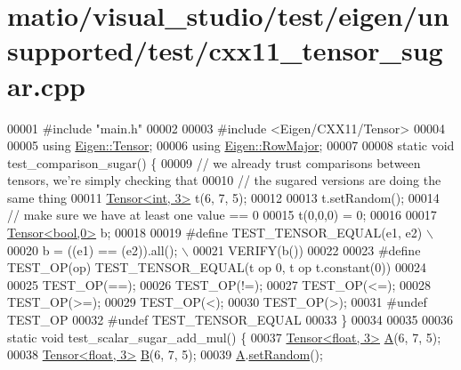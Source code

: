 \hypertarget{matio_2visual__studio_2test_2eigen_2unsupported_2test_2cxx11__tensor__sugar_8cpp_source}{}\section{matio/visual\+\_\+studio/test/eigen/unsupported/test/cxx11\+\_\+tensor\+\_\+sugar.cpp}
\label{matio_2visual__studio_2test_2eigen_2unsupported_2test_2cxx11__tensor__sugar_8cpp_source}

\begin{DoxyCode}
00001 \textcolor{preprocessor}{#include "main.h"}
00002 
00003 \textcolor{preprocessor}{#include <Eigen/CXX11/Tensor>}
00004 
00005 \textcolor{keyword}{using} \hyperlink{class_eigen_1_1_tensor}{Eigen::Tensor};
00006 \textcolor{keyword}{using} \hyperlink{group__enums_ggaacded1a18ae58b0f554751f6cdf9eb13acfcde9cd8677c5f7caf6bd603666aae3}{Eigen::RowMajor};
00007 
00008 \textcolor{keyword}{static} \textcolor{keywordtype}{void} test\_comparison\_sugar() \{
00009   \textcolor{comment}{// we already trust comparisons between tensors, we're simply checking that}
00010   \textcolor{comment}{// the sugared versions are doing the same thing}
00011   \hyperlink{class_eigen_1_1_tensor}{Tensor<int, 3>} t(6, 7, 5);
00012 
00013   t.setRandom();
00014   \textcolor{comment}{// make sure we have at least one value == 0}
00015   t(0,0,0) = 0;
00016 
00017   \hyperlink{class_eigen_1_1_tensor}{Tensor<bool,0>} b;
00018 
00019 \textcolor{preprocessor}{#define TEST\_TENSOR\_EQUAL(e1, e2) \(\backslash\)}
00020 \textcolor{preprocessor}{  b = ((e1) == (e2)).all();       \(\backslash\)}
00021 \textcolor{preprocessor}{  VERIFY(b())}
00022 
00023 \textcolor{preprocessor}{#define TEST\_OP(op) TEST\_TENSOR\_EQUAL(t op 0, t op t.constant(0))}
00024 
00025   TEST\_OP(==);
00026   TEST\_OP(!=);
00027   TEST\_OP(<=);
00028   TEST\_OP(>=);
00029   TEST\_OP(<);
00030   TEST\_OP(>);
00031 \textcolor{preprocessor}{#undef TEST\_OP}
00032 \textcolor{preprocessor}{#undef TEST\_TENSOR\_EQUAL}
00033 \}
00034 
00035 
00036 \textcolor{keyword}{static} \textcolor{keywordtype}{void} test\_scalar\_sugar\_add\_mul() \{
00037   \hyperlink{class_eigen_1_1_tensor}{Tensor<float, 3>} \hyperlink{group___core___module_class_eigen_1_1_matrix}{A}(6, 7, 5);
00038   \hyperlink{class_eigen_1_1_tensor}{Tensor<float, 3>} \hyperlink{group___core___module_class_eigen_1_1_matrix}{B}(6, 7, 5);
00039   \hyperlink{group___core___module_class_eigen_1_1_matrix}{A}.\hyperlink{class_eigen_1_1_plain_object_base_af0e576a0e1aefc9ee346de44cc352ba3}{setRandom}();

\end{DoxyCode}
